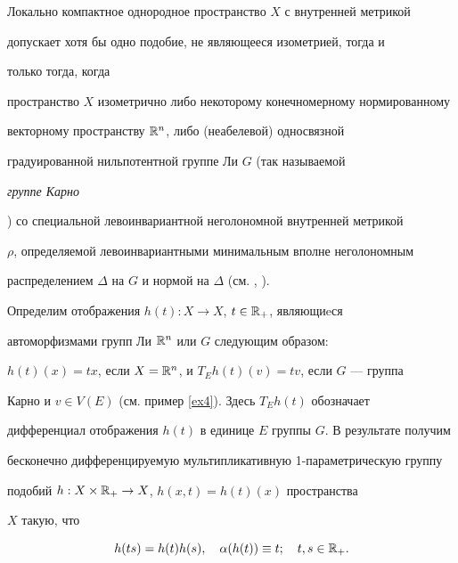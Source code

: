 \begin{exams}


\label{ex3}


Локально компактное однородное пространство $X$ с внутренней метрикой


допускает хотя бы одно подобие, не являющееся изометрией, тогда и


только тогда, когда


пространство $X$ изометрично либо некоторому конечномерному нормированному


векторному пространству $\Bbb{R}^{n}$, либо (неабелевой) односвязной


градуированной нильпотентной группе Ли $G$ (так называемой


{\it группе Карно}


\cite{P}) со специальной левоинвариантной неголономной внутренней метрикой


$\rho$, определяемой левоинвариантными минимальным вполне неголономным


распределением $\Delta$ на $G$ и нормой на $\Delta$ (см. \cite{D}, \cite{B}).


Определим отображения $h(t): X \rightarrow X$, $t \in \Bbb{R}_{+}$, являющиeся


автоморфизмами групп Ли $\Bbb{R}^{n}$ или $G$ следующим образом:


$h(t)(x)=tx$, если $X=\Bbb{R}^{n}$, и $T_{E}h(t)(v)=tv$, если $G$ --- группа


Карно и $v \in V(E)$ (см. пример \ref{ex4}). Здесь $T_{E}h(t)$ обозначает


дифференциал отображения $h(t)$ в единице $E$ группы $G$. В результате получим


бесконечно дифференцируемую мультипликативную 1-параметрическую группу


подобий $h:X \times \Bbb{R}_{+} \rightarrow X$, $h(x,t)=h(t)(x)$ пространства


$X$ такую, что


\begin{equation}


\label{mg}


h(ts)=h(t)h(s),\quad \alpha (h(t)) \equiv t;\quad t,s \in \Bbb{R}_{+}.


\end{equation}


\end{exams}





